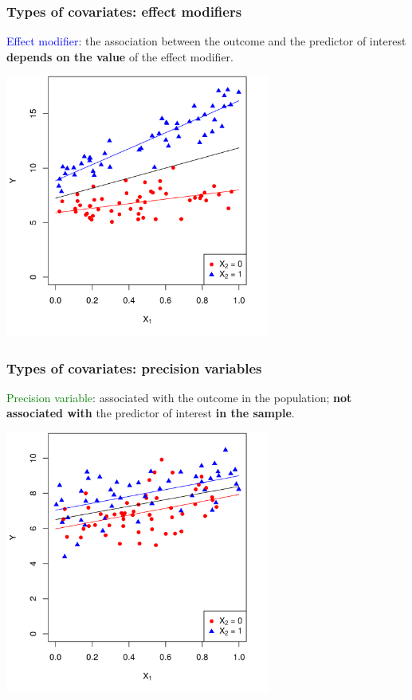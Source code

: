 \documentclass[12pt, 
hyperref={colorlinks=true, linkcolor=blue, urlcolor=cyan}]{beamer}
\begin{document}
\begin{frame}
\frametitle{Types of covariates: effect modifiers}

\textcolor{blue}{Effect modifier}: the association between the outcome and the predictor of interest \textbf{depends on the value} of the effect modifier.

\centering
\vspace{-0.2cm}
\includegraphics[width=0.65\textwidth]{plots/effect_modification_colored_with_lines.png}
\end{frame}

\begin{frame}
\frametitle{Types of covariates: precision variables}

\textcolor{green}{Precision variable}: associated with the outcome in the population; \textbf{not associated with} the predictor of interest \textbf{in the sample}.

\centering
\vspace{-0.2cm}
 \includegraphics[width=0.65\textwidth]{plots/precision_colored_with_multiple_lines.png}
\end{frame}
\end{document}
